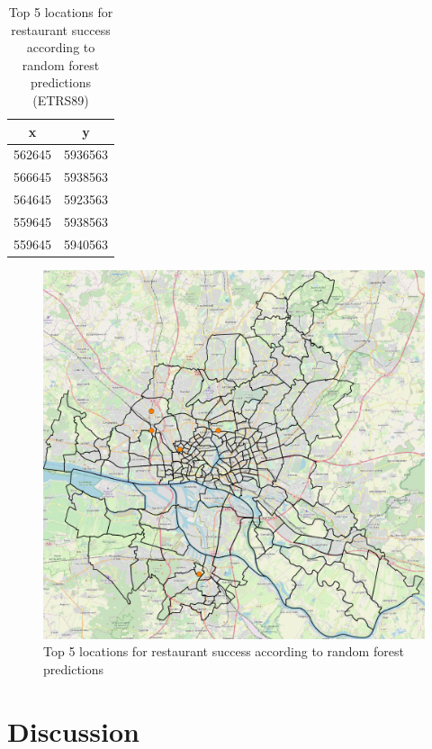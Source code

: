 \documentclass[a4paper, 11pt, oneside]{Thesis}  %
\begin{document}
\begin{table}[h!]
\begin{center}
\begin{tabular}{| c | c |}
\hline
x & y \\
 \hline
 562645 & 5936563 \\ 
 566645 & 5938563 \\  
 564645 & 5923563 \\    
 559645 & 5938563 \\
 559645 & 5940563 \\
 \hline
\end{tabular}

\caption{Top 5 locations for restaurant success according to random forest predictions (ETRS89)}
\label{table:top_five_locations}
\end{center}
\end{table}

\begin{figure}[h]
\includegraphics[scale=0.5]{Figures/Recommendation_map/Top_Five_Locations.png}
\centering
\caption{Top 5 locations for restaurant success according to random forest predictions}
\label{fig:Top_Five_Locations}
\end{figure}


\chapter{Discussion}
\label{Discussion}
\end{document}
